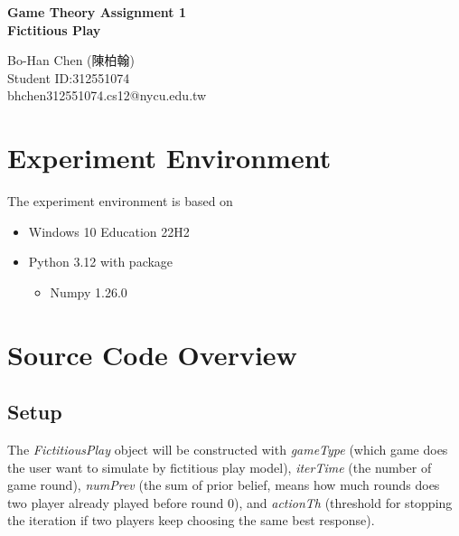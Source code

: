 \documentclass[a4paper, oneside, final, 12pt]{scrartcl} %
\begin{document}


\begin{center}
    {\fontsize{18}{30}\textbf{Game Theory Assignment 1 \\ Fictitious Play}}
\end{center}

\begin{center}
  Bo-Han Chen (陳柏翰) \\
  Student ID:312551074 \\
  bhchen312551074.cs12@nycu.edu.tw
\end{center}

\section{Experiment Environment}

The experiment environment is based on
\begin{itemize}
  \item Windows 10 Education 22H2
  \item Python 3.12 with package
  \begin{itemize}
    \item Numpy 1.26.0
  \end{itemize}
\end{itemize}

\section{Source Code Overview}

\subsection{Setup}

\begingroup
\raggedright
The \emph{FictitiousPlay} object will be constructed with \emph{gameType} 
(which game does the user want to simulate by fictitious play model),
\emph{iterTime} (the number of game round), \emph{numPrev} 
(the sum of prior belief, means how much rounds does two player already played before round 0),
and \emph{actionTh} (threshold for stopping the iteration if two players keep choosing the same best response).
\end{document}
